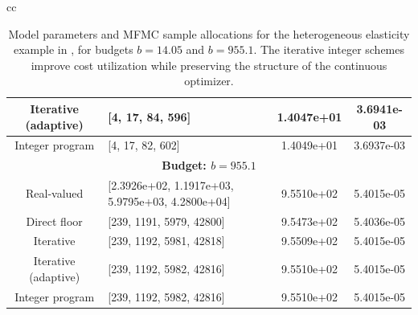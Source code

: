 \begin{table}[ht]
{\begin{tabular}{cc}
\begin{minipage}{0.73\linewidth}
\begin{tabular}{|c|p{5.4cm}|c|c|}
Iterative (adaptive)
& [4,    17,    84,   596]
&1.4047e+01 &3.6941e-03 \\ \hline

Integer program
& [4, 17, 82, 602]
& 1.4049e+01 & 3.6937e-03 \\ \hline

\multicolumn{4}{|c|}{\textbf{Budget: $b = 955.1$}} \\ \hline

Real-valued 
& [2.3926e+02,   1.1917e+03,   5.9795e+03,   4.2800e+04]
& 9.5510e+02 & 5.4015e-05 \\ \hline

Direct floor 
& [239, 1191, 5979, 42800]
& 9.5473e+02 & 5.4036e-05\\ \hline


Iterative 
& [239,        1192,        5981,       42818]
& 9.5509e+02& 5.4015e-05\\ \hline

Iterative (adaptive)
& [239,        1192,        5982,       42816]
& 9.5510e+02 & 5.4015e-05\\ \hline

Integer program
& [239, 1192, 5982, 42816]
& 9.5510e+02 & 5.4015e-05 \\ \hline

\end{tabular}
\end{minipage}

\end{tabular}
}
\caption{Model parameters and MFMC sample allocations for the heterogeneous elasticity example in \cite{GoGeElJa:2020}, for budgets $b=14.05$ and $b=955.1$. The iterative integer schemes improve cost utilization while preserving the structure of the continuous optimizer.}
\label{tab:MFMC_integer_comparison_Eg5}
\end{table}



